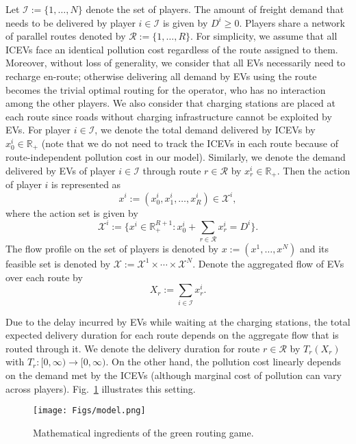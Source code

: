 \documentclass[letterpaper, 10 pt, conference]{ieeeconf}  %
\newcommand{\mc}[1]{\mathcal{#1}}
\newcommand{\bR}{\mathbb{R}}
\begin{document}
Let $\mc{I}:=\{1,\ldots,N\}$ denote the set of players.
The amount of freight demand that needs to be delivered by player $i \in \mc{I}$ is given by $D^i\geq 0$.
Players share a network of parallel routes denoted by $\mc{R}:=\{1,\ldots,R\}$.
For simplicity, we assume that all ICEVs face an identical pollution cost regardless of the route assigned to them.
Moreover, without loss of generality, we consider that all EVs necessarily need to recharge en-route; otherwise delivering all demand by EVs using the route becomes the trivial optimal routing for the operator, who has no interaction among the other players.
We also consider that charging stations are placed at each route since roads without charging infrastructure cannot be exploited by EVs.
For player $i \in \mc{I}$, we denote the total demand delivered by ICEVs by $x^i_0\in\bR_+$ (note that we do not need to track the ICEVs in each route because of route-independent pollution cost in our model).
Similarly, we denote the demand delivered by EVs of player $i \in \mc{I}$ through route $r\in\mc{R}$ by $x^i_r\in\bR_+$.
Then the action of player $i$ is represented as
\[
 x^i:=(x^i_0,x^i_1,\ldots,x^i_R)\in\mc{X}^i,
\]
where the action set is given by
\[
 \textstyle{
  \mc{X}^i:=\{x^i\in\bR^{R+1}_{+}: x^i_0+\sum_{r\in\mc{R}}x^i_r=D^i\}.
 }
\]
The flow profile on the set of players is denoted by
$x:=(x^1,\ldots,x^N)$
and its feasible set is denoted by $\mc{X}:=\mc{X}^1\times\cdots\times\mc{X}^N$.
Denote the aggregated flow of EVs over each route by
\[
 \textstyle{X_r:=\sum_{i \in \mc{I}} x^i_r}.
\]

Due to the delay incurred by EVs while waiting at the charging stations, the total expected delivery duration for each route depends on the aggregate flow that is routed through it.
We denote the delivery duration for route $r\in\mc{R}$ by $T_r(X_r)$ with $T_r:[0,\infty) \to [0,\infty)$.
On the other hand, the pollution cost linearly depends on the demand met by the ICEVs (although marginal cost of pollution can vary across players).
Fig.~\ref{fig:model} illustrates this setting.

\begin{figure}[t]
  \centering
  \texttt{[image: Figs/model.png]}
  \caption{
  Mathematical ingredients of the green routing game.
  }
  \label{fig:model}
\end{figure}
\end{document}
